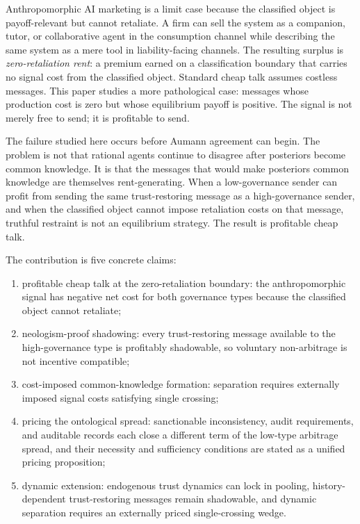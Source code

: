 \documentclass[preprint,authoryear]{elsarticle}
\theoremstyle{definition}
\theoremstyle{plain}
\begin{document}
Anthropomorphic AI marketing is a limit case because the classified object is payoff-relevant but cannot retaliate. A firm can sell the system as a companion, tutor, or collaborative agent in the consumption channel while describing the same system as a mere tool in liability-facing channels. The resulting surplus is \emph{zero-retaliation rent}: a premium earned on a classification boundary that carries no signal cost from the classified object. Standard cheap talk assumes costless messages. This paper studies a more pathological case: messages whose production cost is zero but whose equilibrium payoff is positive. The signal is not merely free to send; it is profitable to send.

The failure studied here occurs before Aumann agreement can begin. The problem is not that rational agents continue to disagree after posteriors become common knowledge. It is that the messages that would make posteriors common knowledge are themselves rent-generating. When a low-governance sender can profit from sending the same trust-restoring message as a high-governance sender, and when the classified object cannot impose retaliation costs on that message, truthful restraint is not an equilibrium strategy. The result is profitable cheap talk.

The contribution is five concrete claims:
\begin{enumerate}
    \item profitable cheap talk at the zero-retaliation boundary: the anthropomorphic signal has negative net cost for both governance types because the classified object cannot retaliate;
    \item neologism-proof shadowing: every trust-restoring message available to the high-governance type is profitably shadowable, so voluntary non-arbitrage is not incentive compatible;
    \item cost-imposed common-knowledge formation: separation requires externally imposed signal costs satisfying single crossing;
    \item pricing the ontological spread: sanctionable inconsistency, audit requirements, and auditable records each close a different term of the low-type arbitrage spread, and their necessity and sufficiency conditions are stated as a unified pricing proposition;
    \item dynamic extension: endogenous trust dynamics can lock in pooling, history-dependent trust-restoring messages remain shadowable, and dynamic separation requires an externally priced single-crossing wedge.
\end{enumerate}
\end{document}
